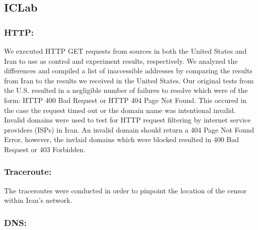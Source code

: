 \subsection{ICLab}

\subsubsection{HTTP:}
We executed HTTP GET requests from sources in both the United States and Iran to use as control and experiment results, respectively. We analyzed the differences and compiled a list of inaccessible addresses by comparing the results from Iran to the results we received in the United States. Our original tests from the U.S.  resulted in a negligible number of failures to resolve which were of the form: HTTP 400 Bad Request or HTTP 404 Page Not Found. This occured in the case the request timed out or the domain name was intentional invalid. Invalid domains were used to test for HTTP request filtering by internet service providers (ISPs) in Iran. An invalid domain should return a 404 Page Not Found Error, however, the invlaid domains which were blocked resulted in 400 Bad Request or 403 Forbidden.\\ 

\subsubsection{Traceroute:} The traceroutes were conducted in order to pinpoint the location of the censor within Iran’s network.\\

\subsubsection{DNS:}\\